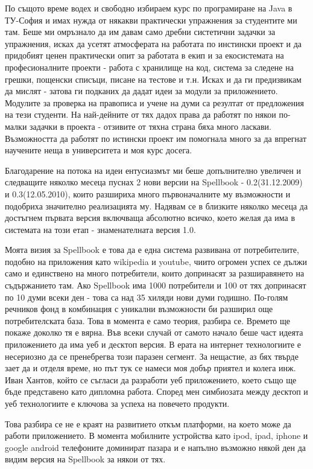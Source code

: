 По същото време водех и свободно избираем курс по програмиране на Java
в ТУ-София и имах нужда от някакви практически упражнения за
студентите ми там. Беше ми омръзнало да им давам само дребни
систетични задачки за упражнения, исках да усетят атмосферата на
работата по инстински проект и да придобият ценен практически опит за
работата в екип и за екосистемата на професионалните проекти - работа
с хранилище на код, система за следене на грешки, пощенски списъци,
писане на тестове и т.н. Исках и да ги предизвикам да мислят - затова
ги подканих да дадат идеи за модули за приложението. Модулите за
проверка на правописа и учене на думи са резултат от предложения на
тези студенти. На най-дейните от тях дадох права да работят по някои
по-малки задачки в проекта - отзивите от тяхна страна бяха много
ласкави. Възможността да работят по истински проект им помогнала много
за да впрегнат научените неща в университета и моя курс досега.

Благодарение на потока на идеи ентусиазмът ми беше допълнително
увеличен и следващите няколко месеца пуснах 2 нови версии на Spellbook
- 0.2(31.12.2009) и 0.3(12.05.2010), които разшириха много
първоначалните му възможности и подобриха значително реализацията
му. Надявам се в близките няколко месеца да достъгнем първата версия
включваща абсолютно всичко, което желая да има в системата на този
етап - знаменателната версия 1.0.

Моята визия за Spellbook е това да е една система развивана от
потребителите, подобно на приложения като wikipedia и youtube, чиито
огромен успех се дължи само и единствено на много потребители, които
допринасят за разширавянето на съдържанието там. Ако Spellbook има
1000 потребители и 100 от тях допринасят по 10 думи всеки ден - това
са над 35 хиляди нови думи годишно. По-голям речников фонд в
комбинация с уникални възможности би разширил още потребителската
база. Това в момента е само теория, разбира се. Времето ще покаже
доколко тя е вярна. Във всеки случай от самото начало беше част идеята
приложението да има уеб и десктоп версия. В ерата на интернет
технологиите е несериозно да се пренебрегва този паразен сегмент. За
нещастие, аз бях твърде зает да и отделя време, но път тук се намеси
моя добър приятел и колега инж. Иван Хантов, който се съгласи да
разработи уеб приложението, което също ще бъде представено като
дипломна работа. Според мен симбиозата между десктоп и уеб
технологиите е ключова за успеха на повечето продукти.

Това разбира се не е краят на развитието откъм платформи, на което
може да работи приложението. В момента мобилните устройства като ipod,
ipad, iphone и google android телефоните доминират пазара и е напълно
възможно някой ден да видим версия на Spellbook за някои от тях.
